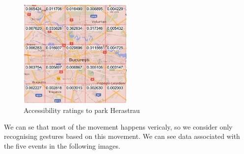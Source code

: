 \begin{figure}
    \centering
    \includegraphics[width=0.5\textwidth]{src/img/Bucharest-Rating.png}
    \caption{Accessibility ratings to park Herastrau}
    \label{fig:access}
\end{figure}

We can se that most of the movement happens vericaly, so we consider only recognising gestures based on this movement. We can see data associated with the five events in the following images.


